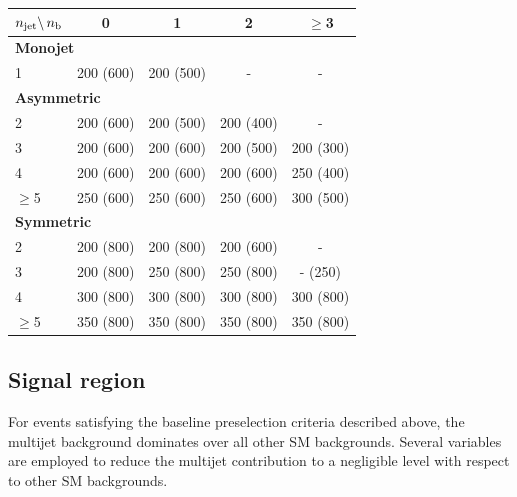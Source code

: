 \begin{table}[tb]
  \label{tab:binning}
  \centering
  \footnotesize
  \begin{tabular}{ lcccc }
    \hline
    $n_{\text{jet}} \backslash\, n_{\text{b}}$ & 0         & 1         & 2         & $\geq$3   \\
    \hline
    \multicolumn{5}{l}{\bf Monojet}                                          \\
    1                        & 200 (600) & 200 (500) & -         & -         \\
    \multicolumn{5}{l}{\bf Asymmetric}                                       \\
    2                        & 200 (600) & 200 (500) & 200 (400) & -         \\
    3                        & 200 (600) & 200 (600) & 200 (500) & 200 (300) \\
    4                        & 200 (600) & 200 (600) & 200 (600) & 250 (400) \\
    $\geq$5                  & 250 (600) & 250 (600) & 250 (600) & 300 (500) \\
    \multicolumn{5}{l}{\bf Symmetric}                                        \\
    2                        & 200 (800) & 200 (800) & 200 (600) & -         \\
    3                        & 200 (800) & 250 (800) & 250 (800) & - (250)   \\
    4                        & 300 (800) & 300 (800) & 300 (800) & 300 (800) \\
    $\geq$5                  & 350 (800) & 350 (800) & 350 (800) & 350 (800) \\
    \hline
  \end{tabular}
\end{table}

\subsection{Signal region}
\label{sec:categorisation} 

For events satisfying the baseline preselection criteria described
above, the multijet background dominates over all other SM
backgrounds. Several variables are employed to reduce the multijet
contribution to a negligible level with respect to other SM
backgrounds.

